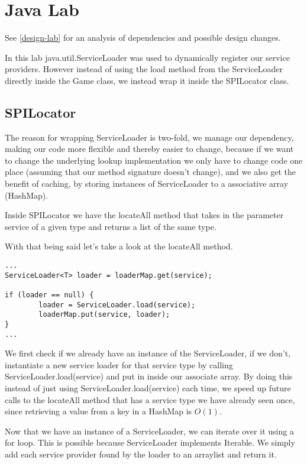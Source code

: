 
\section{Java Lab}

See \ref{design-lab} for an analysis of dependencies and possible design
changes.

In this lab java.util.ServiceLoader was used to dynamically register our
service providers. However instead of using the load method from the
ServiceLoader directly inside the Game class, we instead wrap it inside the SPILocator class.

\subsection{SPILocator}
The reason for wrapping ServiceLoader is two-fold, we manage our dependency, making our code more
flexible and thereby easier to change, because if we want to change the
underlying lookup implementation we only have to change code one place (assuming
that our method signature doesn't change), and we also get the benefit of caching,
by storing instances of ServiceLoader to a associative array (HashMap).

Inside SPILocator we have the locateAll method that takes in the parameter service of
a given type and returns a list of the same type.

With that being said let's take a look at the locateAll method.

\begin{verbatim}
...
ServiceLoader<T> loader = loaderMap.get(service);

if (loader == null) {
        loader = ServiceLoader.load(service);
        loaderMap.put(service, loader);
}
...
\end{verbatim}

We first check if we already have an instance of the ServiceLoader, if
we don't, instantiate a new service loader for that service type by calling
ServiceLoader.load(service) and put in inside our associate array.
By doing this instead of just using ServiceLoader.load(service) each time, we
speed up future calls to the locateAll method that has a service type we have
already seen once, since retrieving a value from a key in a HashMap is $O(1)$.

Now that we have an instance of a ServiceLoader, we can iterate over it using a
for loop. This is possible because ServiceLoader implements Iterable.
We simply add each service provider found by the loader to an arraylist and
return it.

